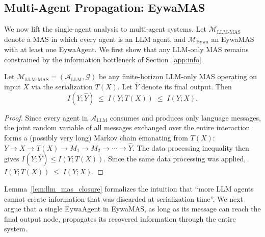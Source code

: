 


\subsection{Multi-Agent Propagation: EywaMAS}
\label{app:mas}

We now lift the single-agent analysis to multi-agent systems. Let $\mathcal{M}_{\mathrm{LLM\text{-}MAS}}$ denote a MAS in which every agent is an LLM agent, and $\mathcal{M}_{\mathrm{Eywa}}$ an EywaMAS with at least one EywaAgent. We first show that any LLM-only MAS remains constrained by the information bottleneck of Section~\ref{app:info}.

\begin{lemma}
\label{lem:llm_mas_closure}
Let $\mathcal{M}_{\mathrm{LLM\text{-}MAS}}=(\mathcal{A}_{\mathrm{LLM}},\mathcal{G})$ be any finite-horizon LLM-only MAS operating on input $X$ via the serialization $T(X)$. Let $\hat Y$ denote its final output. Then
\begin{equation}
I(Y;\hat Y)\;\le\;I(Y;T(X))\;\le\;I(Y; X).
\end{equation}
\end{lemma}
\begin{proof}
Since every agent in $\mathcal{A}_{\mathrm{LLM}}$ consumes and produces only language messages, the joint random variable of all messages exchanged over the entire interaction forms a (possibly very long) Markov chain emanating from $T(X)$: $Y\to X\to T(X)\to M_1\to M_2\to\cdots\to \hat Y$. The data processing inequality then gives $I(Y;\hat Y)\le I(Y;T(X))$. Since the same data processing was applied, $I(Y;T(X))\;\le\;I(Y; X)$.
\end{proof}

Lemma~\ref{lem:llm_mas_closure} formalizes the intuition that ``more LLM agents cannot create information that was discarded at serialization time''. We next argue that a single EywaAgent in EywaMAS, as long as its message can reach the final output node, propagates its recovered information through the entire system.

